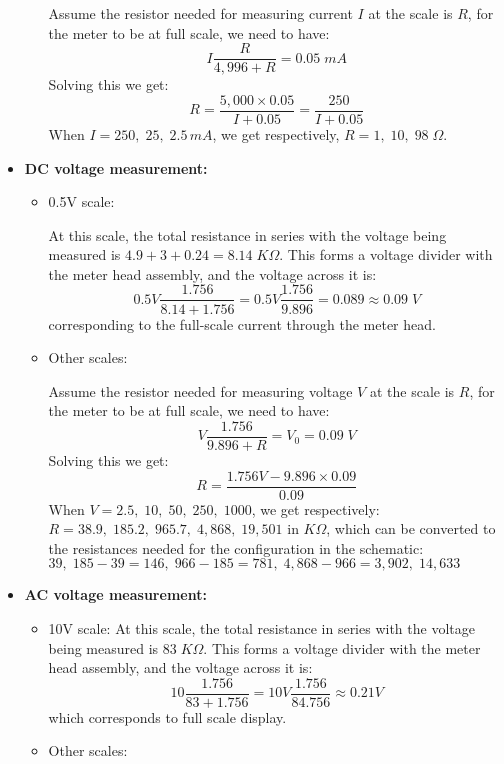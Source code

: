 \begin{itemize}
\begin{itemize}
    Assume the resistor needed for measuring current $I$ at the scale is $R$, for
    the meter to be at full scale, we need to have:
    \[ I \frac{R}{4,996+R}=0.05\;mA \]
    Solving this we get:
    \[ R=\frac{5,000\times 0.05}{I+0.05}=\frac{250}{I+0.05} \]
    When $I=250,\;25,\;2.5\,mA$, we get respectively,
    $R=1,\;10,\;98\;\Omega$.

  \end{itemize}

\item {\bf DC voltage measurement:}

  \begin{itemize}
  \item 0.5V scale:

    At this scale, the total resistance in series with the voltage being measured 
    is $4.9+3+0.24=8.14\;K\Omega$. This forms a voltage divider with the meter head
    assembly, and the voltage across it is:
    \[ 0.5V \frac{1.756}{8.14+1.756} =0.5V \frac{1.756}{9.896}=0.089\approx 0.09\;V \]
    corresponding to the full-scale current through the meter head.

  \item Other scales:

    Assume the resistor needed for measuring voltage $V$ at the scale is $R$, for 
    the meter to be at full scale, we need to have:
    \[ V\frac{1.756}{9.896+R}=V_0=0.09\;V \]
    Solving this we get:
    \[ R=\frac{1.756V-9.896\times 0.09}{0.09}  \]
    When $V=2.5,\;10,\;50,\;250,\;1000$, we get respectively:
    $R=38.9,\;185.2,\;965.7,\;4,868,\;19,501$ in $K\Omega$, which can be converted
    to the resistances needed for the configuration in the schematic:
    $39,\;185-39=146,\;966-185=781,\;4,868-966=3,902,\;14,633$

  \end{itemize}

\item {\bf AC voltage measurement:}

  \begin{itemize}

  \item 10V scale:
    At this scale, the total resistance in series with the voltage being measured 
    is $83\;K\Omega$. This forms a voltage divider with the meter head assembly, 
    and the voltage across it is:
    \[ 10 \frac{1.756}{83+1.756}=10V \frac{1.756}{84.756}\approx 0.21V \]
    which corresponds to full scale display.

  \item Other scales:


\end{itemize}
\end{itemize}
